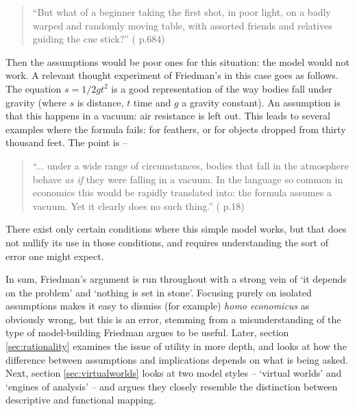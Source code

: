 \begin{quote}
``But what of a beginner taking the first shot, in poor light, on a badly warped and randomly moving table, with assorted friends and relatives guiding the cue stick?'' (\citealt{conlisk_why_1996} p.684)
\end{quote}

Then the assumptions would be poor ones for this situation: the model would not work.  A relevant thought experiment of Friedman's in this case goes as follows. The equation $s=1/2gt^2$ is a good representation of the way bodies fall under gravity (where $s$ is distance, $t$ time and $g$ a gravity constant). An assumption is that this happens in a vacuum: air resistance is left out. This leads to several examples where the formula fails: for feathers, or for objects dropped from thirty thousand feet. The point is – 

\begin{quote}
``... under a wide range of circumstances, bodies that fall in the atmosphere behave \emph{as if} they were falling in a vacuum. In the language so common in economics this would be rapidly translated into: the formula assumes a vacuum. Yet it clearly does no such thing.'' (\citealt{friedman_essays_1953} p.18)
\end{quote}

There exist only certain conditions where this simple model works, but that does not nullify its use in those conditions, and requires understanding the sort of error one might expect. 

In sum, Friedman's argument is run throughout with a strong vein of `it depends on the problem' and `nothing is set in stone'. Focusing purely on isolated assumptions makes it easy to dismiss (for example) \emph{homo economicus} as obviously wrong, but this is an error, stemming from a misunderstanding of the type of model-building Friedman argues to be useful. Later, section \ref{sec:rationality} examines the issue of utility in more depth, and looks at how the difference between assumptions and implications depends on what is being asked. Next, section \ref{sec:virtualworlds} looks at two model styles – `virtual worlds' and `engines of analysis' – and argues they closely resemble the distinction between descriptive and functional mapping. 

